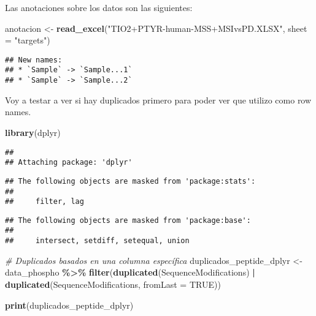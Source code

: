 \documentclass[
]{article}
\newenvironment{Shaded}{\begin{snugshade}}{\end{snugshade}}
\newcommand{\AttributeTok}[1]{\textcolor[rgb]{0.13,0.29,0.53}{#1}}
\newcommand{\CommentTok}[1]{\textcolor[rgb]{0.56,0.35,0.01}{\textit{#1}}}
\newcommand{\ConstantTok}[1]{\textcolor[rgb]{0.56,0.35,0.01}{#1}}
\newcommand{\FunctionTok}[1]{\textcolor[rgb]{0.13,0.29,0.53}{\textbf{#1}}}
\newcommand{\NormalTok}[1]{#1}
\newcommand{\OtherTok}[1]{\textcolor[rgb]{0.56,0.35,0.01}{#1}}
\newcommand{\SpecialCharTok}[1]{\textcolor[rgb]{0.81,0.36,0.00}{\textbf{#1}}}
\newcommand{\StringTok}[1]{\textcolor[rgb]{0.31,0.60,0.02}{#1}}
\begin{document}
Las anotaciones sobre los datos son las siguientes:

\begin{Shaded}
\begin{Highlighting}[]
\NormalTok{anotacion }\OtherTok{\textless{}{-}} \FunctionTok{read\_excel}\NormalTok{(}\StringTok{"TIO2+PTYR{-}human{-}MSS+MSIvsPD.XLSX"}\NormalTok{, }\AttributeTok{sheet =} \StringTok{"targets"}\NormalTok{)}
\end{Highlighting}
\end{Shaded}

\begin{verbatim}
## New names:
## * `Sample` -> `Sample...1`
## * `Sample` -> `Sample...2`
\end{verbatim}

Voy a testar a ver si hay duplicados primero para poder ver que utilizo
como row names.

\begin{Shaded}
\begin{Highlighting}[]
\FunctionTok{library}\NormalTok{(dplyr)}
\end{Highlighting}
\end{Shaded}

\begin{verbatim}
## 
## Attaching package: 'dplyr'
\end{verbatim}

\begin{verbatim}
## The following objects are masked from 'package:stats':
## 
##     filter, lag
\end{verbatim}

\begin{verbatim}
## The following objects are masked from 'package:base':
## 
##     intersect, setdiff, setequal, union
\end{verbatim}

\begin{Shaded}
\begin{Highlighting}[]
\CommentTok{\# Duplicados basados en una columna específica}
\NormalTok{duplicados\_peptide\_dplyr }\OtherTok{\textless{}{-}}\NormalTok{ data\_phospho }\SpecialCharTok{\%\textgreater{}\%}
  \FunctionTok{filter}\NormalTok{(}\FunctionTok{duplicated}\NormalTok{(SequenceModifications) }\SpecialCharTok{|} \FunctionTok{duplicated}\NormalTok{(SequenceModifications, }\AttributeTok{fromLast =} \ConstantTok{TRUE}\NormalTok{))}

\FunctionTok{print}\NormalTok{(duplicados\_peptide\_dplyr)}
\end{Highlighting}
\end{Shaded}
\end{document}
